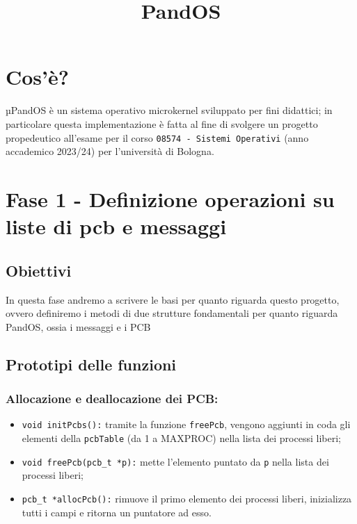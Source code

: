 \documentclass{article}
\title{\textmu PandOS}
\date{}
\begin{document}
\maketitle

\tableofcontents
\newpage
\section{Cos'è?}
µPandOS è un sistema operativo microkernel sviluppato per fini didattici; in particolare questa implementazione è fatta al fine di svolgere un progetto propedeutico all'esame per il corso \texttt{08574 - Sistemi Operativi} (anno accademico 2023/24) per l'università di Bologna.\\

\section{Fase 1 - Definizione operazioni su liste di pcb e messaggi}
\subsection{Obiettivi}
In questa fase andremo a scrivere le basi per quanto riguarda questo progetto, ovvero definiremo i metodi di due strutture fondamentali per quanto riguarda PandOS, ossia i messaggi e i PCB

\subsection{Prototipi delle funzioni}
\subsubsection{Allocazione e deallocazione dei PCB:}
\begin{itemize}
    \item \texttt{void initPcbs():} tramite la funzione \texttt{freePcb}, vengono aggiunti in coda gli elementi della \texttt{pcbTable} (da 1 a MAXPROC) nella lista dei processi liberi;
    \item \texttt{void freePcb(pcb\_t *p):} mette l'elemento puntato da \texttt{p} nella lista dei processi liberi;
    \item \texttt{pcb\_t *allocPcb():} rimuove il primo elemento dei processi liberi, inizializza tutti i campi e ritorna un puntatore ad esso.
\end{itemize}
\end{document}

